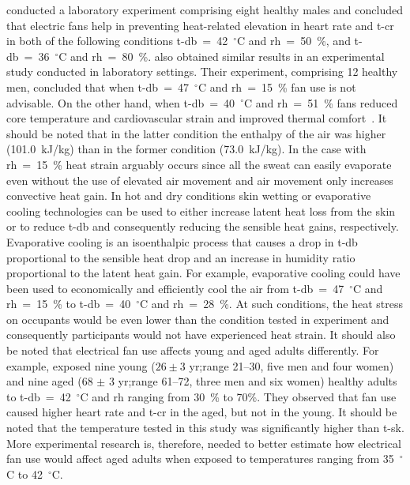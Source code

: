  conducted a laboratory experiment comprising eight healthy males and concluded that electric fans help in preventing heat-related elevation in heart rate and \ac{t-cr} in both of the following conditions \ac{t-db}~=~42~$^{\circ}$C and \ac{rh}~=~50~\%, and \ac{t-db}~=~36~$^{\circ}$C and \ac{rh}~=~80~\%.
 also obtained similar results in an experimental study conducted in laboratory settings.
Their experiment, comprising 12 healthy men, concluded that when \ac{t-db}~=~47~$^{\circ}$C and \ac{rh}~=~15~\% fan use is not advisable.
On the other hand, when \ac{t-db}~=~40~$^{\circ}$C and \ac{rh}~=~51~\% fans reduced core temperature and cardiovascular strain and improved thermal comfort~\cite{Morris2019}.
It should be noted that in the latter condition the enthalpy of the air was higher (101.0~kJ/kg) than in the former condition (73.0~kJ/kg).
In the case with \ac{rh}~=~15~\% heat strain arguably occurs since all the sweat can easily evaporate even without the use of elevated air movement and air movement only increases convective heat gain.
In hot and dry conditions skin wetting or evaporative cooling technologies can be used to either increase latent heat loss from the skin or to reduce \ac{t-db} and consequently reducing the sensible heat gains, respectively. 
Evaporative cooling is an isoenthalpic process that causes a drop in \ac{t-db} proportional to the sensible heat drop and an increase in humidity ratio proportional to the latent heat gain.
For example, evaporative cooling could have been used to economically and efficiently cool the air from \ac{t-db}~=~47~$^{\circ}$C and \ac{rh}~=~15~\% to \ac{t-db}~=~40~$^{\circ}$C and \ac{rh}~=~28~\%\@.
At such conditions, the heat stress on occupants would be even lower than the condition tested in  experiment and consequently participants would not have experienced heat strain.
It should also be noted that electrical fan use affects young and aged adults differently.
For example,  exposed nine young ($26 \pm 3$ yr;\@ range 21--30, five men and four women) and nine aged (68 $\pm$ 3 yr;\@ range 61--72, three men and six women) healthy adults to \ac{t-db}~=~42~$^{\circ}$C and \ac{rh} ranging from 30~\% to 70\%.
They observed that fan use caused higher heart rate and \ac{t-cr} in the aged, but not in the young.
It should be noted that the temperature tested in this study was significantly higher than \ac{t-sk}.
More experimental research is, therefore, needed to better estimate how electrical fan use would affect aged adults when exposed to temperatures ranging from 35~$^{\circ}$C to 42~$^{\circ}$C\@.

